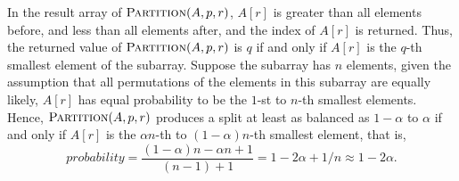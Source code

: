 \documentclass[12pt,reqno]{amsart}
\newif\ifanswer
\begin{document}
\begin{enumerate}[1.]
\ifanswer
{}
In the result array of $\textsc{Partition}(A, p, r)$, $A[r]$ is greater than all elements before, and less than all elements after, and the index of $A[r]$ is returned. Thus, the returned value of $\textsc{Partition}(A, p, r)$ is $q$ if and only if $A[r]$ is the $q$-th smallest element of the subarray. Suppose the subarray has $n$ elements, given the assumption that all permutations of the elements in this subarray are equally likely, $A[r]$ has equal probability to be the $1$-st to $n$-th smallest elements. Hence, $\textsc{Partition}(A, p, r)$ produces a split at least as balanced as $1 - \alpha$ to  $\alpha$ if and only if $A[r]$ is the $\alpha n$-th to $(1 - \alpha)n$-th smallest element, that is,
$$
probability = \frac{(1 - \alpha)n - \alpha n + 1}{(n - 1) + 1} = 1 - 2\alpha + 1/n \approx 1 - 2\alpha.
$$
\vspace{1cm}



\end{enumerate}
\end{document}

